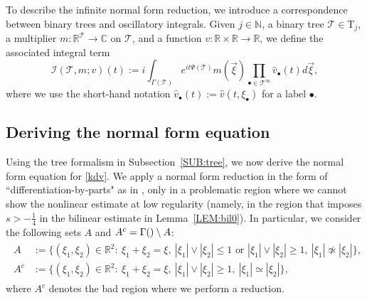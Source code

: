 \documentclass[a4paper,
11pt,  reqno]{amsart}
\makeatletter
\newcommand{\5}{\textup{V}}
\newcommand{\ft}{\widehat}
\theoremstyle{remark}
\newcommand{\R}{\mathbb{R}}
\newcommand{\bbC}{\mathbb{C}}
\newcommand{\bul}{\bullet}
\newcommand{\TT}{\mathcal{T}}
\newcommand{\Tr}{\mathrm{T}}
\newcommand{\G}{\Gamma}
\newcommand{\N}{\mathbb{N}}
\def\<#1>{\csname MH@symb@#1\endcsname}
\newcommand{\Ical}{\mathcal{I}}
\numberwithin{equation}{section}
\numberwithin{theorem}{section}
\makeatother
\begin{document}
To describe the infinite normal form reduction, we introduce a correspondence between binary trees and oscillatory integrals.
Given $j\in\N$, a binary tree $\TT \in \Tr_j$, a multiplier $m:\R^{\TT}\to \bbC$ on $\TT$, and a
function $v: \R\times \R \to\R$, we define the associated integral term
\begin{equation}\label{eq:defiI}
\Ical(\TT, m; v)(t) :=   i \int_{\G(\TT)}
e^{it\Psi(\TT)}m(\vec{\xi})
\prod_{\bul\in \TT^\infty}  \ft v_\bul (t) d\vec{\xi},
\end{equation}
where
we use the short-hand notation  $\ft v_\bul(t) := \ft v(t,\xi_\bul)$ for a label $\bul$.








\subsection{Deriving the normal form equation}\label{sec:nfe}

Using the tree formalism in Subsection~\ref{SUB:tree}, we now derive the normal form equation for \eqref{kdv}.
We apply a normal form reduction in the form of ``differentiation-by-parts" as in \cite{bit}, only in a problematic region where we cannot show the nonlinear estimate at low regularity
(namely, in the region that imposes $s>-\frac14$ in the bilinear estimate in Lemma~\ref{LEM:bil0}).
In particular, we consider the following sets $A$ and $A^c = \G({\<1>}) \setminus A$:
\begin{align}
\label{A}
\begin{split}
A & := \big\{ (\xi_{1}, \xi_{2}) \in \R^2: \ \xi_{1}+ \xi_{2} = \xi, \  |\xi_{1}| \lor  |\xi_{2}| \le 1 \text{ or } |\xi_{1}| \lor  |\xi_{2}| \ge 1,  \ |\xi_{1}| \not\simeq |\xi_{2}| \big\}, \\
A^c & := \big\{ (\xi_{1}, \xi_2) \in \R^2: \ \xi_{1}+ \xi_{2} = \xi,  \ |\xi_{1}| \lor |\xi_{2}| \ge 1 , \ |\xi_{1}| \simeq |\xi_{2}| \big\},
\end{split}
\end{align}
where $A^c$ denotes the bad region where we perform a reduction.
\end{document}

